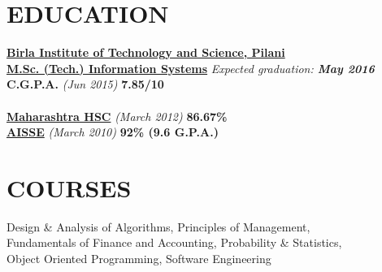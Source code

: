 \documentclass[margin]{res}
\begin{document}
\begin{resume}                        
 

\section{EDUCATION}       \textbf{\href{http://www.bits-pilani.ac.in/goa/}{Birla Institute of Technology and Science, Pilani}} \\
                \textbf{\href{http://www.bits-pilani.ac.in/goa/ComputerScienceInformationsSystems/ComputerScienceandInformationSystems}{M.Sc. (Tech.) Information Systems}}
                 \textit{Expected graduation: \textbf{May 2016} }\\
                \textbf{C.G.P.A.} \textit{(Jun 2015)} \textbf{7.85/10} \\ \\
                \textbf {\href {https://mahahsscboard.maharashtra.gov.in/}{Maharashtra HSC}} \textit{(March 2012)} \textbf {86.67\%} \\ 
                \textbf{\href {https://en.wikipedia.org/wiki/All_India_Secondary_School_Examination}{AISSE}} \textit{(March 2010)} \textbf{92\% (9.6 G.P.A.)}
                
\section{COURSES}
                Design \& Analysis of Algorithms, Principles of Management, \\Fundamentals of Finance and Accounting, Probability \& Statistics, \\Object Oriented Programming, Software Engineering
 
 

\end{resume}
\end{document}
